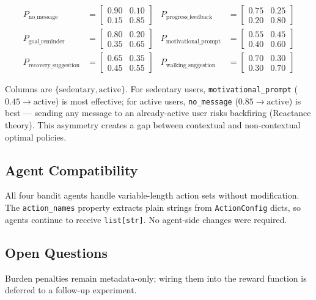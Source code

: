 \documentclass[11pt]{article}
\begin{document}
\begin{align*}
P_{\text{no\_message}} &=
\begin{bmatrix}
0.90 & 0.10 \\
0.15 & 0.85
\end{bmatrix}
&
P_{\text{progress\_feedback}} &=
\begin{bmatrix}
0.75 & 0.25 \\
0.20 & 0.80
\end{bmatrix}
\\
P_{\text{goal\_reminder}} &=
\begin{bmatrix}
0.80 & 0.20 \\
0.35 & 0.65
\end{bmatrix}
&
P_{\text{motivational\_prompt}} &=
\begin{bmatrix}
0.55 & 0.45 \\
0.40 & 0.60
\end{bmatrix}
\\
P_{\text{recovery\_suggestion}} &=
\begin{bmatrix}
0.65 & 0.35 \\
0.45 & 0.55
\end{bmatrix}
&
P_{\text{walking\_suggestion}} &=
\begin{bmatrix}
0.70 & 0.30 \\
0.30 & 0.70
\end{bmatrix}
\end{align*}

\noindent Columns are $\{\text{sedentary}, \text{active}\}$. For sedentary users, \texttt{motivational\_prompt} ($0.45 \to \text{active}$) is most effective; for active users, \texttt{no\_message} ($0.85 \to \text{active}$) is best --- sending any message to an already-active user risks backfiring (Reactance theory). This asymmetry creates a gap between contextual and non-contextual optimal policies.

\subsection{Agent Compatibility}
\label{sec:agent-compat}

All four bandit agents handle variable-length action sets without modification. The \texttt{action\_names} property extracts plain strings from \texttt{ActionConfig} dicts, so agents continue to receive \texttt{list[str]}. No agent-side changes were required.

\subsection{Open Questions}
Burden penalties remain metadata-only; wiring them into the reward function is deferred to a follow-up experiment.
\end{document}
